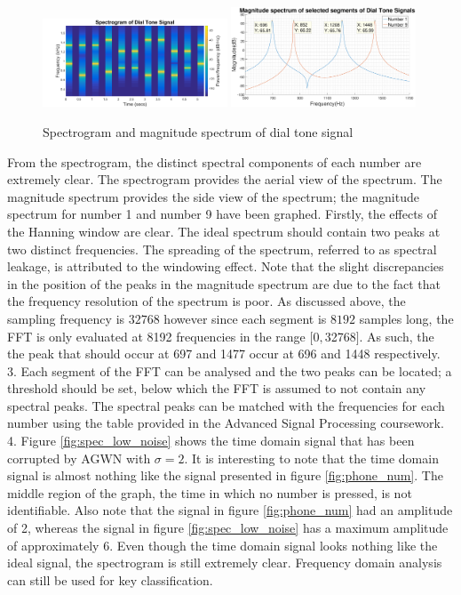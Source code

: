 \documentclass{article}
\begin{document}
\begin{figure}[H]
    \centering
    \includegraphics[width=0.49\textwidth,natwidth=610,natheight=642]{spectrogram.png}
    \includegraphics[width=0.49\textwidth]{mag_spec_dial_tone}
    \caption{Spectrogram and magnitude spectrum of dial tone signal}
    \label{fig:spectrogram}
\end{figure}

From the spectrogram, the distinct spectral components of each number are extremely clear. The spectrogram provides the aerial view of the spectrum. The magnitude spectrum provides the side view of the spectrum; the magnitude spectrum for number 1 and number 9 have been graphed. Firstly, the effects of the Hanning window are clear. The ideal spectrum should contain two peaks at two distinct frequencies. The spreading of the spectrum, referred to as spectral leakage, is attributed to the windowing effect. Note that the slight discrepancies in the position of the peaks in the magnitude spectrum are due to the fact that the frequency resolution of the spectrum is poor. As discussed above, the sampling frequency is $32768$ however since each segment is $8192$ samples long, the FFT is only evaluated at 8192 frequencies in the range $[0, $32768$]$. As such, the the peak that should occur at 697 and 1477 occur at 696 and 1448 respectively.\\

3. Each segment of the FFT can be analysed and the two peaks can be located; a threshold should be set, below which the FFT is assumed to not contain any spectral peaks. The spectral peaks can be matched with the frequencies for each number using the table provided in the Advanced Signal Processing coursework.\\

4. Figure \ref{fig:spec_low_noise} shows the time domain signal that has been corrupted by AGWN with $\sigma = 2$. It is interesting to note that the time domain signal is almost nothing like the signal presented in figure \ref{fig:phone_num}. The middle region of the graph, the time in which no number is pressed, is not identifiable. Also note that the signal in figure \ref{fig:phone_num} had an amplitude of 2, whereas the signal in figure \ref{fig:spec_low_noise} has a maximum amplitude of approximately 6. Even though the time domain signal looks nothing like the ideal signal, the spectrogram is still extremely clear. Frequency domain analysis can still be used for key classification.
\end{document}
